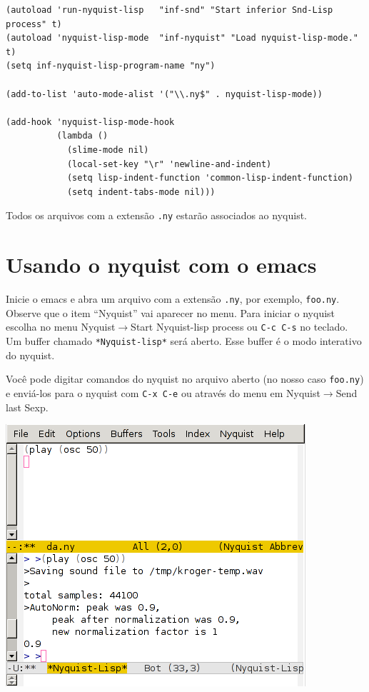 \documentclass[12pt,brazil]{book}
\newcommand{\sep}{$\rightarrow$}
\begin{document}
\begin{verbatim}
(autoload 'run-nyquist-lisp   "inf-snd" "Start inferior Snd-Lisp process" t)
(autoload 'nyquist-lisp-mode  "inf-nyquist" "Load nyquist-lisp-mode." t)
(setq inf-nyquist-lisp-program-name "ny")

(add-to-list 'auto-mode-alist '("\\.ny$" . nyquist-lisp-mode))

(add-hook 'nyquist-lisp-mode-hook
          (lambda ()
            (slime-mode nil)
            (local-set-key "\r" 'newline-and-indent)
            (setq lisp-indent-function 'common-lisp-indent-function)
            (setq indent-tabs-mode nil)))
\end{verbatim}

Todos os arquivos com a extensão \texttt{.ny} estarão associados ao
nyquist.

\section{Usando o nyquist com o emacs}
\label{sec:usando-o-nyquist}

Inicie o emacs e abra um arquivo com a extensão \texttt{.ny}, por
exemplo, \texttt{foo.ny}. Observe que o item ``Nyquist'' vai aparecer
no menu. Para iniciar o nyquist escolha no menu Nyquist\sep Start
Nyquist-lisp process ou \texttt{C-c C-s} no teclado. Um buffer chamado
\texttt{*Nyquist-lisp*} será aberto. Esse buffer é o modo interativo
do nyquist.

Você pode digitar comandos do nyquist no arquivo aberto (no nosso caso
\texttt{foo.ny}) e enviá-los para o nyquist com \texttt{C-x C-e} ou
através do menu em Nyquist\sep Send last Sexp.

\begin{htmlonly}
  \includegraphics{ny2}
\end{htmlonly}
\end{document}
